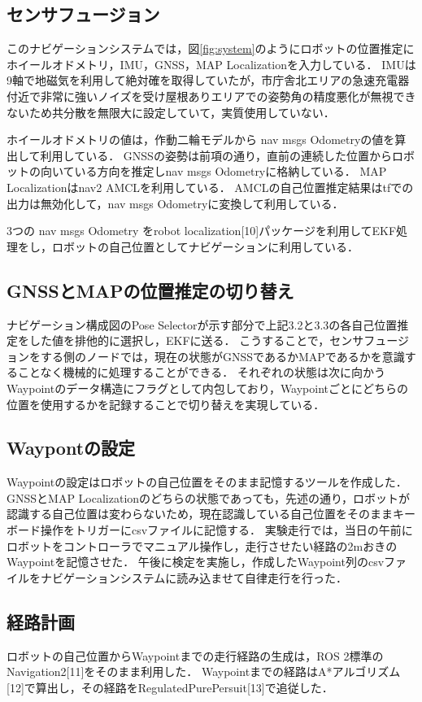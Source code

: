 \documentclass[platex,dvipdfmx]{rbproceedings}
\begin{document}
\subsection{センサフュージョン}
このナビゲーションシステムでは，図\ref{fig:system}のようにロボットの位置推定にホイールオドメトリ，IMU，GNSS，MAP Localizationを入力している．
IMUは9軸で地磁気を利用して絶対確を取得していたが，市庁舎北エリアの急速充電器付近で非常に強いノイズを受け屋根ありエリアでの姿勢角の精度悪化が無視できないため共分散を無限大に設定していて，実質使用していない．

ホイールオドメトリの値は，作動二輪モデルから nav msgs Odometryの値を算出して利用している．
GNSSの姿勢は前項の通り，直前の連続した位置からロボットの向いている方向を推定しnav msgs Odometryに格納している．
MAP Localizationはnav2 AMCLを利用している．
AMCLの自己位置推定結果はtfでの出力は無効化して，nav msgs Odometryに変換して利用している．

3つの nav msgs Odometry をrobot localization[10]パッケージを利用してEKF処理をし，ロボットの自己位置としてナビゲーションに利用している．

\subsection{GNSSとMAPの位置推定の切り替え}
ナビゲーション構成図のPose Selectorが示す部分で上記3.2と3.3の各自己位置推定をした値を排他的に選択し，EKFに送る．
こうすることで，センサフュージョンをする側のノードでは，現在の状態がGNSSであるかMAPであるかを意識することなく機械的に処理することができる．
それぞれの状態は次に向かうWaypointのデータ構造にフラグとして内包しており，Waypointごとにどちらの位置を使用するかを記録することで切り替えを実現している．

\subsection{Waypontの設定}
Waypointの設定はロボットの自己位置をそのまま記憶するツールを作成した．
GNSSとMAP Localizationのどちらの状態であっても，先述の通り，ロボットが認識する自己位置は変わらないため，現在認識している自己位置をそのままキーボード操作をトリガーにcsvファイルに記憶する．
実験走行では，当日の午前にロボットをコントローラでマニュアル操作し，走行させたい経路の2mおきのWaypointを記憶させた．
午後に検定を実施し，作成したWaypoint列のcsvファイルをナビゲーションシステムに読み込ませて自律走行を行った．

\subsection{経路計画}
ロボットの自己位置からWaypointまでの走行経路の生成は，ROS 2標準のNavigation2[11]をそのまま利用した．
Waypointまでの経路はA*アルゴリズム[12]で算出し，その経路をRegulatedPurePersuit[13]で追従した．
\end{document}
